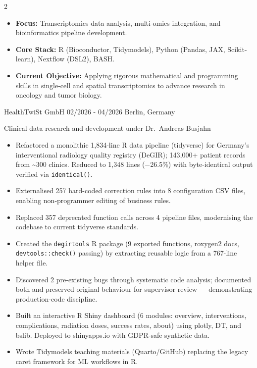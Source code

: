\documentclass{thejus_cv}
\begin{document}
\begin{paracol}{2}


\begin{itemize}[label=\textbullet, leftmargin=1em]
    \item \textbf{Focus:} Transcriptomics data analysis, multi-omics integration, and bioinformatics pipeline development.
    \item \textbf{Core Stack:} R (Bioconductor, Tidymodels), Python (Pandas, JAX, Scikit-learn), Nextflow (DSL2), BASH.
    \item \textbf{Current Objective:} Applying rigorous mathematical and programming skills in single-cell and spatial transcriptomics to advance research in oncology and tumor biology.
\end{itemize}


             {HealthTwiSt GmbH}
             {02/2026 - 04/2026}
             {Berlin, Germany}
             {Clinical data research and development under Dr.~Andreas Busjahn
             \begin{itemize}
                   \item Refactored a monolithic 1,834-line R data pipeline (tidyverse) for Germany's interventional radiology quality registry (DeGIR); 143,000+ patient records from \textasciitilde300 clinics. Reduced to 1,348 lines ($-$26.5\%) with byte-identical output verified via \texttt{identical()}.
                   \item Externalised 257 hard-coded correction rules into 8 configuration CSV files, enabling non-programmer editing of business rules.
                   \item Replaced 357 deprecated function calls across 4 pipeline files, modernising the codebase to current tidyverse standards.
                   \item Created the \texttt{degirtools} R package (9 exported functions, roxygen2 docs, \texttt{devtools::check()} passing) by extracting reusable logic from a 767-line helper file.
                   \item Discovered 2 pre-existing bugs through systematic code analysis; documented both and preserved original behaviour for supervisor review --- demonstrating production-code discipline.
                   \item Built an interactive R Shiny dashboard (6 modules: overview, interventions, complications, radiation doses, success rates, about) using plotly, DT, and bslib. Deployed to shinyapps.io with GDPR-safe synthetic data.
                   \item Wrote Tidymodels teaching materials (Quarto/GitHub) replacing the legacy caret framework for ML workflows in R.
               \end{itemize}}


\end{paracol}
\end{document}
